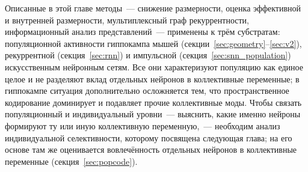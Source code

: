 

Описанные в этой главе методы~--- снижение размерности, оценка эффективной и внутренней размерности, мультиплексный граф рекуррентности, информационный анализ представлений~--- применены к трём субстратам: популяционной активности гиппокампа мышей (секции~\ref{sec:geometry}--\ref{sec:v2}), рекуррентной (секция~\ref{sec:rnn}) и импульсной (секция~\ref{sec:snn_population}) искусственным нейронным сетям. Все они характеризуют популяцию как единое целое и не разделяют вклад отдельных нейронов в коллективные переменные; в гиппокампе ситуация дополнительно осложняется тем, что пространственное кодирование доминирует и подавляет прочие коллективные моды. Чтобы связать популяционный и индивидуальный уровни~--- выяснить, какие именно нейроны формируют ту или иную коллективную переменную,~--- необходим анализ индивидуальной селективности, которому посвящена следующая глава; на его основе там же оценивается вовлечённость отдельных нейронов в коллективные переменные (секция~\ref{sec:popcode}).

\FloatBarrier
